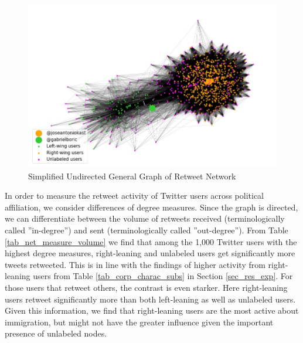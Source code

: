 
        
        \begin{figure}[H]
             \centering
             \includegraphics[width=.85\textwidth]{figs/thesis_entire_graph_1000_2.jpeg}
             \caption{Simplified Undirected General Graph of Retweet Network}
             \label{fig_entire_graph_1000}
             
        \end{figure}

  
            \newline\noindent  
         In order to measure the retweet activity of Twitter users across political affiliation, we consider differences of degree measures. Since the graph is directed, we can differentiate between the volume of retweets received (terminologically called ''in-degree'') and sent (terminologically called ''out-degree''). From Table \ref{tab_net_measure_volume} we find that among the 1,000 Twitter users with the highest degree measures, right-leaning and unlabeled users get significantly more tweets retweeted. This is in line with the findings of higher activity from right-leaning users from Table \ref{tab_corp_charac_subs} in Section \ref{sec_res_exp}. For those users that retweet others, the contrast is even starker. Here right-leaning users retweet significantly more than both left-leaning as well as unlabeled users. Given this information, we find that right-leaning users are the most active about immigration, but might not have the greater influence given the important presence of unlabeled nodes.



